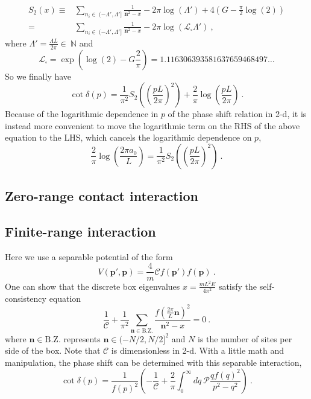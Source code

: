 \begin{align}
S_2(x)\equiv&\sum_{n_i\in\ (-\Lambda',\Lambda']}\frac { 1 } { \bm{n}^2 -x}-2\pi\log\left(\Lambda'\right)+4\left(G-\frac{\pi }{2}\log(2)\right)\\
=&\sum_{n_i\in\ (-\Lambda',\Lambda']}\frac { 1 } { \bm{n}^2 -x}-2\pi\log\left(\mathcal{L}_\square\Lambda'\right)\ ,
\end{align}
where $\Lambda'=\frac{\Lambda L}{2\pi} \in\ \mathbb{N}$ and
\begin{equation}
\mathcal{L}_\square=\exp\left(\log(2)-G\frac{2}{\pi}\right)=1.116306393581637659468497\ldots
\end{equation}
So we finally have
\begin{equation}\label{eqn:S2}
\cot\delta(p)=\frac{1}{\pi^2}S_2\left(\left(\frac{p L}{2\pi}\right)^2\right)+\frac{2}{\pi}\log\left(\frac{pL}{2\pi}\right)\ .
\end{equation}
Because of the logarithmic dependence in $p$ of the phase shift relation in 2-d, it is instead more convenient to move the logarithmic term on the RHS of the above equation to the LHS, which cancels the logarithmic dependence on $p$,
\begin{equation}
\frac{2}{\pi}\log\left(\frac{2\pi a_0 }{L}\right)=\frac{1}{\pi^2}S_2\left(\left(\frac{p L}{2\pi}\right)^2\right)\ .
\end{equation}

\subsection{Zero-range contact interaction}

\subsection{Finite-range interaction}
Here we use a separable potential of the form
\begin{equation}
V(\bm p',\bm p)=\frac{4}{m}\mathcal{C}f(\bm p')f(\bm p)\ .
\end{equation}
One can show that the discrete box eigenvalues $x=\frac{mL^2E}{4\pi^2}$ satisfy the self-consistency equation
\begin{equation}\label{eqn:SE}
\frac{1}{\mathcal{C}}+\frac{1}{\pi^2}\sum_{\bm n\in\mathrm{B.Z.}}\frac{f\left(\frac{2\pi}{L}\bm n\right)^2}{\bm n^2-x}=0\ .
\end{equation}
where $\bm n\in\mathrm{B.Z.}$ represents $\bm n\in(-N/2,N/2]^2$ and $N$ is the number of sites per side of the box.  Note that $\mathcal{C}$ is dimensionless in 2-d.  With a little math and manipulation, the phase shift can be determined with this separable interaction,
\begin{equation}\label{eqn:cot d}
\cot \delta(p) = \frac{1}{f(p)^2}\left(-\frac{1}{\mathcal{C}}+\frac{2}{\pi}\int_0^\infty dq \ \mathcal{P}\frac{qf(q)^2}{p^2-q^2}\right)\ .
\end{equation}

